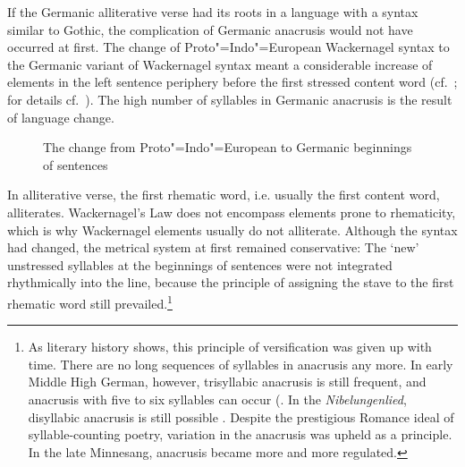 \documentclass[output=paper
  ,nobabel
  ,uniformtopskip %
]{langscibook}
\begin{document}
\largerpage[2]
If the Germanic alliterative verse had its roots in a language with a syntax similar to Gothic, the complication of Germanic anacrusis would not have occurred at first. The change of Proto"=Indo"=European Wackernagel syntax to the Germanic variant of Wackernagel syntax meant a considerable increase of elements in the left sentence periphery before the first stressed content word (cf.\ ; for details cf.\ \citealt{NoelAzizHanna2015}). The high number of syllables in Germanic anacrusis is the result of language change.

\begin{figure}
\caption{The change from Proto"=Indo"=European to Germanic beginnings of sentences} \label{figure1}
\end{figure}

In alliterative verse, the first rhematic word, i.e. usually the first content word, alliterates. Wackernagel's Law does not encompass elements prone to rhematicity, which is why Wackernagel elements usually do not alliterate. Although the syntax had changed, the metrical system at first remained conservative: The `new' unstressed syllables at the beginnings of sentences were not integrated rhythmically into the line, because the principle of assigning the stave to the first rhematic word still prevailed.\footnote{As literary history shows, this principle of versification was given up with time. There are no long sequences of syllables in anacrusis any more. In early Middle High German, however, trisyllabic anacrusis is still frequent, and anacrusis with five to six syllables can occur (\citet[§53]{PaulGlier1961}. In the \textit{Nibelungenlied}, disyllabic anacrusis is still possible \citep[37]{Reichert2005}. Despite the prestigious Romance ideal of syllable-counting poetry, variation in the anacrusis was upheld as a principle. In the late Minnesang, anacrusis became more and more regulated.} 
\end{document}
